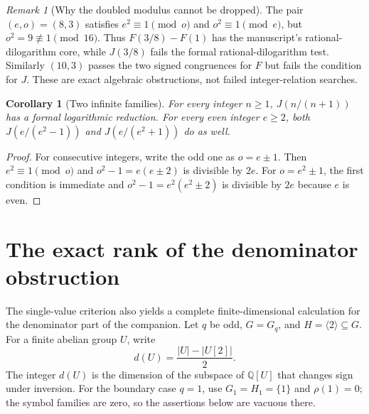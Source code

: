 \documentclass[11pt,a4paper]{article}
\newtheorem{corollary}[theorem]{Corollary}
\theoremstyle{definition}
\theoremstyle{remark}
\newtheorem{remark}[theorem]{Remark}
\numberwithin{equation}{section}
\begin{document}
\begin{remark}[Why the doubled modulus cannot be dropped]
The pair $(e,o)=(8,3)$ satisfies $e^2\equiv1\pmod o$ and
$o^2\equiv1\pmod e$, but $o^2=9\not\equiv1\pmod{16}$.
Thus $F(3/8)-F(1)$ has the manuscript's rational-dilogarithm core,
while $J(3/8)$ fails the formal rational-dilogarithm test. Similarly
$(10,3)$ passes the two signed congruences for $F$ but fails the
condition for $J$. These are exact algebraic obstructions, not
failed integer-relation searches.
\end{remark}

\begin{corollary}[Two infinite families]\label{jnew:cor:families}
For every integer $n\ge1$, $J(n/(n+1))$ has a formal logarithmic
reduction. For every even integer $e\ge2$, both
$J(e/(e^2-1))$ and $J(e/(e^2+1))$ do as well.
\end{corollary}
\begin{proof}
For consecutive integers, write the odd one as $o=e\pm1$.
Then $e^2\equiv1\pmod o$ and
$o^2-1=e(e\pm2)$ is divisible by $2e$.
For $o=e^2\pm1$, the first condition is immediate and
$o^2-1=e^2(e^2\pm2)$ is divisible by $2e$ because $e$ is even.
\end{proof}
\section{The exact rank of the denominator obstruction}
\label{jnew:sec:rank}

The single-value criterion also yields a complete finite-dimensional
calculation for the denominator part of the companion. Let $q$ be odd,
$G=G_q$, and $H=\langle2\rangle\subseteq G$. For a finite abelian
group $U$, write
\[
 d(U)=\frac{|U|-|U[2]|}{2}.
\]
The integer $d(U)$ is the dimension of the subspace of
$\mathbb Q[U]$ that changes sign under inversion.
For the boundary case $q=1$, use $G_1=H_1=\{1\}$ and $\rho(1)=0$;
the symbol families are zero, so the assertions below are vacuous there.
\end{document}
